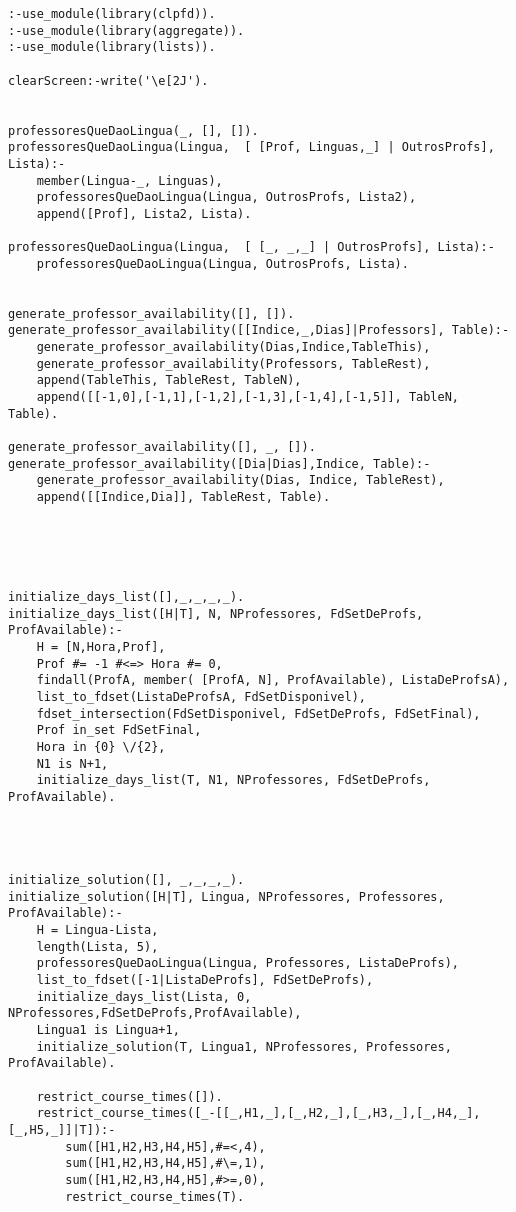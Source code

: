 \documentclass{llncs}
\begin{document}
\begin{verbatim}
:-use_module(library(clpfd)).
:-use_module(library(aggregate)).
:-use_module(library(lists)).

clearScreen:-write('\e[2J').


professoresQueDaoLingua(_, [], []).
professoresQueDaoLingua(Lingua,  [ [Prof, Linguas,_] | OutrosProfs], Lista):-
	member(Lingua-_, Linguas),
	professoresQueDaoLingua(Lingua, OutrosProfs, Lista2),
	append([Prof], Lista2, Lista).

professoresQueDaoLingua(Lingua,  [ [_, _,_] | OutrosProfs], Lista):-
	professoresQueDaoLingua(Lingua, OutrosProfs, Lista).


generate_professor_availability([], []).
generate_professor_availability([[Indice,_,Dias]|Professors], Table):-
	generate_professor_availability(Dias,Indice,TableThis),
	generate_professor_availability(Professors, TableRest),
	append(TableThis, TableRest, TableN),
	append([[-1,0],[-1,1],[-1,2],[-1,3],[-1,4],[-1,5]], TableN, Table).

generate_professor_availability([], _, []).
generate_professor_availability([Dia|Dias],Indice, Table):-
	generate_professor_availability(Dias, Indice, TableRest),
	append([[Indice,Dia]], TableRest, Table).





initialize_days_list([],_,_,_,_).
initialize_days_list([H|T], N, NProfessores, FdSetDeProfs, ProfAvailable):-
	H = [N,Hora,Prof],
	Prof #= -1 #<=> Hora #= 0,
	findall(ProfA, member( [ProfA, N], ProfAvailable), ListaDeProfsA),
	list_to_fdset(ListaDeProfsA, FdSetDisponivel),
	fdset_intersection(FdSetDisponivel, FdSetDeProfs, FdSetFinal),
	Prof in_set FdSetFinal,
	Hora in {0} \/{2},
	N1 is N+1,
	initialize_days_list(T, N1, NProfessores, FdSetDeProfs, ProfAvailable).




initialize_solution([], _,_,_,_).
initialize_solution([H|T], Lingua, NProfessores, Professores, ProfAvailable):-
	H = Lingua-Lista,
	length(Lista, 5),
	professoresQueDaoLingua(Lingua, Professores, ListaDeProfs),
	list_to_fdset([-1|ListaDeProfs], FdSetDeProfs),
	initialize_days_list(Lista, 0, NProfessores,FdSetDeProfs,ProfAvailable),
	Lingua1 is Lingua+1,
	initialize_solution(T, Lingua1, NProfessores, Professores, ProfAvailable).

	restrict_course_times([]).
	restrict_course_times([_-[[_,H1,_],[_,H2,_],[_,H3,_],[_,H4,_],[_,H5,_]]|T]):-
		sum([H1,H2,H3,H4,H5],#=<,4),
		sum([H1,H2,H3,H4,H5],#\=,1),
		sum([H1,H2,H3,H4,H5],#>=,0),
		restrict_course_times(T).




\end{verbatim}
\end{document}
